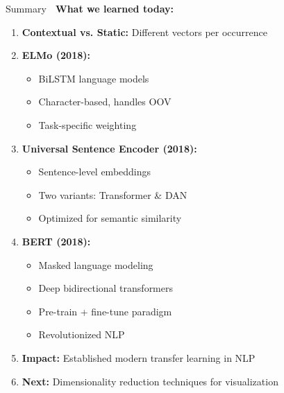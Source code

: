 \documentclass[aspectratio=169]{beamer}
\begin{document}
\begin{frame}[shrink=10]{Summary 🎯}
\textbf{What we learned today:}

\begin{enumerate}\setlength{\itemsep}{0pt}
    \item \textbf{Contextual vs. Static:} Different vectors per occurrence

    \item \textbf{ELMo (2018):}
    \begin{itemize}\setlength{\itemsep}{0pt}
        \item BiLSTM language models
        \item Character-based, handles OOV
        \item Task-specific weighting
    \end{itemize}

    \item \textbf{Universal Sentence Encoder (2018):}
    \begin{itemize}\setlength{\itemsep}{0pt}
        \item Sentence-level embeddings
        \item Two variants: Transformer \& DAN
        \item Optimized for semantic similarity
    \end{itemize}

    \item \textbf{BERT (2018):}
    \begin{itemize}\setlength{\itemsep}{0pt}
        \item Masked language modeling
        \item Deep bidirectional transformers
        \item Pre-train + fine-tune paradigm
        \item Revolutionized NLP
    \end{itemize}

    \item \textbf{Impact:} Established modern transfer learning in NLP

    \item \textbf{Next:} Dimensionality reduction techniques for visualization
\end{enumerate}
\end{frame}
\end{document}
